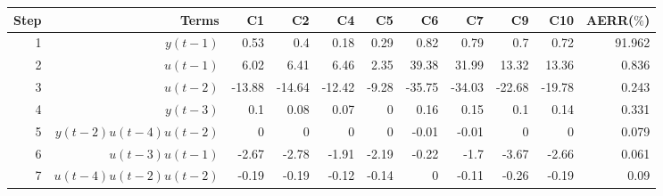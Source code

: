 \begin{tabular}{rrrrrrrrrrr}
Step & Terms & C1 & C2 & C4 & C5 & C6 & C7 & C9 & C10 & AERR($\%$) \\ 
\hline 
1 & $y(t-1)$ & 0.53 & 0.4 & 0.18 & 0.29 & 0.82 & 0.79 & 0.7 & 0.72 & 91.962 \\ 
2 & $u(t-1)$ & 6.02 & 6.41 & 6.46 & 2.35 & 39.38 & 31.99 & 13.32 & 13.36 & 0.836 \\ 
3 & $u(t-2)$ & -13.88 & -14.64 & -12.42 & -9.28 & -35.75 & -34.03 & -22.68 & -19.78 & 0.243 \\ 
4 & $y(t-3)$ & 0.1 & 0.08 & 0.07 & 0 & 0.16 & 0.15 & 0.1 & 0.14 & 0.331 \\ 
5 & $y(t-2)u(t-4)u(t-2)$ & 0 & 0 & 0 & 0 & -0.01 & -0.01 & 0 & 0 & 0.079 \\ 
6 & $u(t-3)u(t-1)$ & -2.67 & -2.78 & -1.91 & -2.19 & -0.22 & -1.7 & -3.67 & -2.66 & 0.061 \\ 
7 & $u(t-4)u(t-2)u(t-2)$ & -0.19 & -0.19 & -0.12 & -0.14 & 0 & -0.11 & -0.26 & -0.19 & 0.09 \\ 
\hline 
\end{tabular}